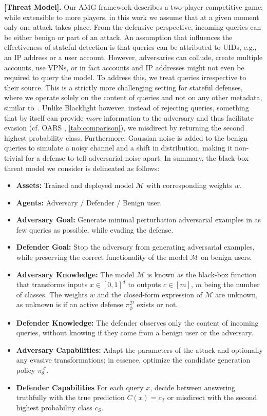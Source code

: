 \textbf{[Threat Model].} Our AMG framework describes a two-player competitive game; while extensible to more players, in this work we assume that at a given moment only one attack takes place.
From the defensive perspective, incoming queries can be either benign or part of an attack.
An assumption that influences the effectiveness of stateful detection is that queries can be attributed to UIDs, e.g., an IP address or a user account.
However, adversaries can collude, create multiple accounts, use VPNs, or in fact accounts and IP addresses might not even be required to query the model.
To address this, we treat queries irrespective to their source.
This is a strictly more challenging setting for stateful defenses, where we operate solely on the content of queries and not on any other metadata, similar to~\cite{li2022blacklight}.
Unlike Blacklight however, instead of rejecting queries, something that by itself can provide \textit{more} information to the adversary and thus facilitate evasion (cf. OARS \cite{feng2023stateful}, \autoref{tab:comparison}), we misdirect by returning the second highest probability class.
Furthermore, Gaussian noise is added to the benign queries to simulate a noisy channel and a shift in distribution, making it non-trivial for a defense to tell adversarial noise apart.
In summary, the black-box threat model we consider is delineated as follows:

\begin{itemize}
    \item \textbf{Assets:} Trained and deployed model $\mathcal{M}$ with corresponding weights ${w}$.
    \item \textbf{Agents:} Adversary / Defender / Benign user.
    \item \textbf{Adversary Goal:} Generate minimal perturbation adversarial examples in as few queries as possible, while evading the defense.
    \item \textbf{Defender Goal:} Stop the adversary from generating adversarial examples, while preserving the correct functionality of the model $\mathcal{M}$ on benign users.
    \item \textbf{Adversary Knowledge:} The model $\mathcal{M}$ is known as the black-box function that transforms inputs $x \in [0,1]^d$ to outputs $c \in [m]$, $m$ being the number of classes. The weights ${w}$ and the closed-form expression of $\mathcal{M}$ are unknown, as unknown is if an active defense $\pi_\phi^{\mathcal{D}}$ exists or not.
    \item \textbf{Defender Knowledge:} The defender observes only the content of incoming queries, without knowing if they come from a benign user or the adversary.
    \item \textbf{Adversary Capabilities:} Adapt the parameters of the attack and optionally any evasive transformations; in essence, optimize the candidate generation policy $\pi^{\mathcal{A}}_\theta$.
    \item \textbf{Defender Capabilities} For each query $x$, decide between answering truthfully with the true prediction $C(x) = c_T$ or misdirect with the second highest probability class $c_S$.
\end{itemize}

